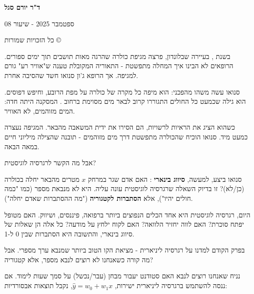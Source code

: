 

\noindent\textbf{}

\begin{center}
\textbf{ד"ר יורם סגל}

ספטמבר 2025 - שיעור 08

כל הזכויות שמורות \textenglish{©}
\end{center}

\vspace{0.5cm}


בשנת , בעיירה  שבלונדון, פרצה מגיפת כולרה שהרגה מאות תושבים תוך ימים ספורים. הרופאים לא הבינו איך המחלה מתפשטת - התאוריה המקובלת טענה ש"אוויר רע" גורם למגיפה. אך הרופא ג'ון סנואו  חשד שהסיבה אחרת.

סנואו עשה משהו מהפכני: הוא מיפה כל מקרה של כולרה על מפת הרובע, וחיפש דפוסים. הוא גילה שכמעט כל החולים התגוררו קרוב לבאר מים מסוימת ברחוב . המסקנה היתה חדה: המים מזוהמים, לא האוויר.

כשהוא הציג את הראיות לרשויות, הם הסירו את ידית המשאבה מהבאר. המגיפה נעצרה כמעט מיד. סנואו הוכיח שהכולרה מתפשטת דרך מים מזוהמים - תובנה שהצילה מיליוני חיים במאה הבאה.

אבל מה הקשר לרגרסיה לוגיסטית?

סנואו ביצע, למעשה, \textbf{סיווג בינארי} : האם אדם שגר במרחק $x$ מטרים מהבאר יחלה בכולרה (כן/לא)? זו בדיוק השאלה שרגרסיה לוגיסטית עונה עליה. היא לא מנבאת מספר (כמו "כמה חולים יהיו"), אלא \textbf{הסתברות לקטגוריה} ("מה ההסתברות שאדם יחלה").

היום, רגרסיה לוגיסטית היא אחד הכלים הנפוצים ביותר ברפואה, פיננסים, ושיווק. האם מטופל יפתח סוכרת? האם לווה יחזיר הלוואה? האם לקוח ילחץ על מודעה? כל אלה הן שאלות של סיווג בינארי, והתשובה היא הסתברות שבין \num{0} ל-\num{1}.


בפרק הקודם למדנו על רגרסיה ליניארית - מציאת הקו הטוב ביותר שמנבא ערך מספרי. אבל מה קורה כשאנחנו לא רוצים לנבא מספר, אלא קטגוריה?

נניח שאנחנו רוצים לנבא האם סטודנט יעבור מבחן (עבר/נכשל) על סמך שעות לימוד. אם ננסה להשתמש ברגרסיה ליניארית ישירות, $\hat{y} = w_0 + w_1 x$, נקבל תוצאות אבסורדיות:

